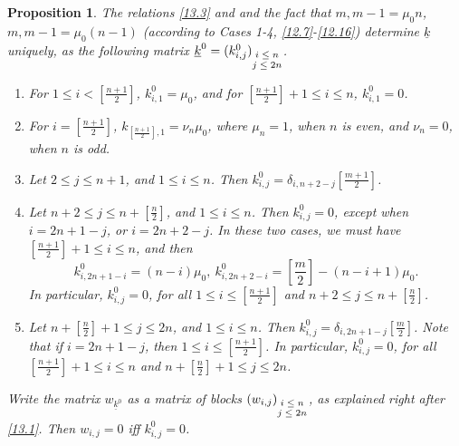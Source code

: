 \documentclass[12pts]{amsart}
\newtheorem{prop}[thm]{Proposition}
\begin{document}
\begin{prop}\label{prop 13.2}
The relations \eqref{13.3} and and the fact that $m, m-1=\mu_0n$, $m, m-1=\mu_0(n-1)$ (according to Cases 1-4, \eqref{12.7}-\eqref{12.16}) determine $\underline{k}$ uniquely, as the following matrix $\underline{k}^0=(k^0_{i,j})_{\scriptsize{\begin{matrix}i\leq n\\j\leq 2n\end{matrix}}}$.
\begin{enumerate}
	\item For $1\leq i< [\frac{n+1}{2}]$, $k^0_{i,1}=\mu_0$, and for $[\frac{n+1}{2}]+1\leq i\leq n$, $k^0_{i,1}=0$.\\
	\item For $i=[\frac{n+1}{2}]$, $k_{[\frac{n+1}{2}],1}=\nu_n\mu_0$, where $\mu_n=1$, when $n$ is even, and $\nu_n=0$, when $n$ is odd.
	\item Let $2\leq j\leq n+1$, and $1\leq i\leq n$. Then $k^0_{i,j}=\delta_{i,n+2-j}[\frac{m+1}{2}]$.\\
	\item Let $n+2\leq j\leq n+[\frac{n}{2}]$, and $1\leq i\leq n$. Then $k^0_{i,j}=0$, except when $i=2n+1-j$, or $i=2n+2-j$. In these two cases, we must have $[\frac{n+1}{2}]+1\leq i\leq n$, and then
	$$
	k^0_{i,2n+1-i}=(n-i)\mu_0,\ k^0_{i,2n+2-i}=[\frac{m}{2}]-(n-i+1)\mu_0.
	$$
	In particular, $k^0_{i,j}=0$, for all $1\leq i\leq [\frac{n+1}{2}]$ and $n+2\leq j\leq n+[\frac{n}{2}]$.\\
	\item Let $n+[\frac{n}{2}]+1\leq j\leq 2n$, and $1\leq i\leq n$. Then $k^0_{i,j}=\delta_{i,2n+1-j}[\frac{m}{2}]$. Note that if $i=2n+1-j$, then
	$1\leq i\leq [\frac{n+1}{2}]$. In particular, $k^0_{i,j}=0$, for all $[\frac{n+1}{2}]+1\leq i\leq n$ and $n+[\frac{n}{2}]+1\leq j\leq 2n$.
	\end{enumerate}	
Write the matrix $w_{\underline{k}^0}$ as a matrix of blocks $(w_{i,j})_{\scriptsize{\begin{matrix}i\leq n\\j\leq 2n\end{matrix}}}$, as explained right after \eqref{13.1}. Then $w_{i,j}=0$ iff $k^0_{i,j}=0$.
\end{prop}	
\end{document}
